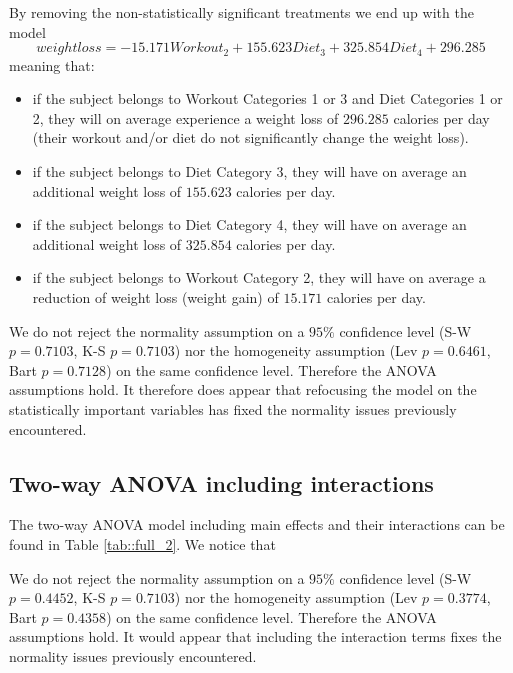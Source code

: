 \documentclass[12pt, a4paper]{article}
\begin{document}
	By removing the non-statistically significant treatments we end up with the model 
	$$
	weightloss = -15.171 Workout_2 + 155.623 Diet_3 + 325.854 Diet_4 + 296.285 
	$$ 
	meaning that:
	
	\begin{itemize}
		\item if the subject belongs to Workout Categories 1 or 3 and Diet Categories 1 or 2, they will on average experience a weight loss of $296.285$ calories per day (their workout and/or diet do not significantly change the weight loss). 
		
		\item if the subject belongs to Diet Category 3, they will have on average an additional weight loss of $155.623$ calories per day.
		
		\item if the subject belongs to Diet Category 4, they will have on average an additional weight loss of $325.854$ calories per day.
		
		\item if the subject belongs to Workout Category 2, they will have on average a reduction of weight loss (weight gain) of $15.171$ calories per day.

	\end{itemize}
	
	We do not reject the normality assumption on a $95\%$ confidence level (S-W $p=0.7103$, K-S $p=0.7103$) nor the homogeneity assumption (Lev $p=0.6461$, Bart $p=0.7128$) on the same confidence level. Therefore the ANOVA assumptions hold. It therefore does appear that refocusing the model on the statistically important variables has fixed the normality issues previously encountered.
	
	
	\subsection{Two-way ANOVA including interactions}
	
	The two-way ANOVA model including main effects and their interactions can be found in Table \ref{tab::full_2}. We notice that 
	
	
	
	We do not reject the normality assumption on a $95\%$ confidence level (S-W $p=0.4452$, K-S $p=0.7103$) nor the homogeneity assumption (Lev $p=0.3774$, Bart $p=0.4358$) on the same confidence level. Therefore the ANOVA assumptions hold. It would appear that including the interaction terms fixes the normality issues previously encountered.
		
\end{document}
